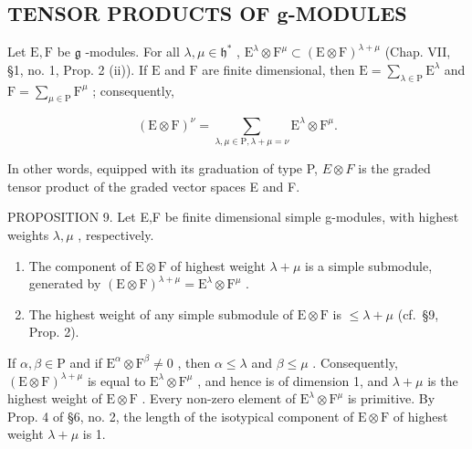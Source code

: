 \subsection{TENSOR PRODUCTS OF g-MODULES}

Let \(\mathrm{E},\mathrm{F}\) be \(\mathfrak{g}\) -modules. For all \(\lambda, \mu \in \mathfrak{h}^*\) , \(\mathrm{E}^\lambda \otimes \mathrm{F}^\mu \subset (\mathrm{E} \otimes \mathrm{F})^{\lambda + \mu}\) (Chap. VII, §1, no. 1, Prop. 2 (ii)). If \(\mathrm{E}\) and \(\mathrm{F}\) are finite dimensional, then \(\mathrm{E} = \sum_{\lambda \in \mathrm{P}} \mathrm{E}^\lambda\) and \(\mathrm{F} = \sum_{\mu \in \mathrm{P}} \mathrm{F}^\mu\) ; consequently,

\[
(\mathrm{E} \otimes \mathrm{F}) ^ {\nu} = \sum_ {\lambda , \mu \in \mathrm{P}, \lambda + \mu = \nu} \mathrm{E} ^ {\lambda} \otimes \mathrm{F} ^ {\mu}.
\]

In other words, equipped with its graduation of type P, \(E \otimes F\) is the graded tensor product of the graded vector spaces E and F.

PROPOSITION 9. Let E,F be finite dimensional simple g-modules, with highest weights \(\lambda,\mu\) , respectively.

\begin{enumerate}
\def\labelenumi{(\roman{enumi})}
\item
  The component of \(\mathrm{E} \otimes \mathrm{F}\) of highest weight \(\lambda + \mu\) is a simple submodule, generated by \((\mathrm{E} \otimes \mathrm{F})^{\lambda + \mu} = \mathrm{E}^{\lambda} \otimes \mathrm{F}^{\mu}\) .
\item
  The highest weight of any simple submodule of \(\mathrm{E} \otimes \mathrm{F}\) is \(\leq \lambda + \mu\) (cf.~§9, Prop. 2).
\end{enumerate}

If \(\alpha, \beta \in \mathrm{P}\) and if \(\mathrm{E}^{\alpha} \otimes \mathrm{F}^{\beta} \neq 0\) , then \(\alpha \leq \lambda\) and \(\beta \leq \mu\) . Consequently, \((\mathrm{E} \otimes \mathrm{F})^{\lambda + \mu}\) is equal to \(\mathrm{E}^{\lambda} \otimes \mathrm{F}^{\mu}\) , and hence is of dimension 1, and \(\lambda + \mu\) is the highest weight of \(\mathrm{E} \otimes \mathrm{F}\) . Every non-zero element of \(\mathrm{E}^{\lambda} \otimes \mathrm{F}^{\mu}\) is primitive. By Prop. 4 of §6, no. 2, the length of the isotypical component of \(\mathrm{E} \otimes \mathrm{F}\) of highest weight \(\lambda + \mu\) is 1.


